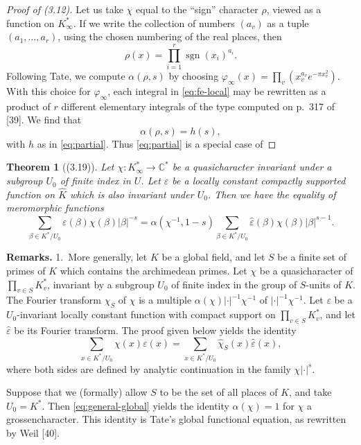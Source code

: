 \documentclass[12pt,a4paper]{article}
\theoremstyle{plain}
\newtheorem{theorem}{Theorem}[section]
\theoremstyle{definition}
\DeclareMathOperator{\sgn}{sgn}
\newcommand{\C}{\mathbb{C}}
\begin{document}
\begin{proof}[Proof of (3.12)]
Let us take $\chi$ equal to the ``sign'' character $\rho$, viewed as a function on $K_{\infty}^*$. If we write the collection of numbers $(a_v)$ as a tuple $(a_1,\dots,a_r)$, using the chosen numbering of the real places, then
\[
\rho(x)=\prod_{i=1}^r\sgn(x_i)^{a_i}.
\]
Following Tate, we compute $\alpha(\rho,s)$ by choosing $\varphi_{\infty}(x)=\prod_v(x_v^{a_v}e^{-\pi x_v^2})$. With this choice for $\varphi_{\infty}$, each integral in \eqref{eq:fe-local} may be rewritten as a product of $r$ different elementary integrals of the type computed on p.~317 of [39]. We find that
\[
\alpha(\rho,s)=h(s),
\]
with $h$ as in \eqref{eq:partial}. Thus \eqref{eq:partial} is a special case of
\end{proof}

\begin{theorem}[(3.19)]\label{thm:general-fe}
Let $\chi:K_{\infty}^*\to\C^*$ be a quasicharacter invariant under a subgroup $U_0$ of finite index in $U$. Let $\varepsilon$ be a locally constant compactly supported function on $\hat{K}$ which is also invariant under $U_0$. Then we have the equality of meromorphic functions
\[
\sum_{\beta\in K^*/U_0}\varepsilon(\beta)\chi(\beta)|\beta|^{-s}=\alpha(\chi^{-1},1-s)\sum_{\beta\in K^*/U_0}\hat{\varepsilon}(\beta)\chi(\beta)|\beta|^{s-1}.
\]
\end{theorem}

\textbf{Remarks.} 1.~More generally, let $K$ be a global field, and let $S$ be a finite set of primes of $K$ which contains the archimedean primes. Let $\chi$ be a quasicharacter of $\prod_{v\in S}K_v^*$, invariant by a subgroup $U_0$ of finite index in the group of $S$-units of $K$. The Fourier transform $\hat{\chi}_S$ of $\chi$ is a multiple $\alpha(\chi)|\cdot|^{-1}\chi^{-1}$ of $|\cdot|^{-1}\chi^{-1}$. Let $\varepsilon$ be a $U_0$-invariant locally constant function with compact support on $\prod_{v\in S}K_v^*$, and let $\hat{\varepsilon}$ be its Fourier transform. The proof given below yields the identity
\begin{equation}\label{eq:general-global}
\sum_{x\in K^*/U_0}\chi(x)\varepsilon(x)=\sum_{x\in K^*/U_0}\hat{\chi}_S(x)\hat{\varepsilon}(x),
\end{equation}
where both sides are defined by analytic continuation in the family $\chi|\cdot|^s$.

Suppose that we (formally) allow $S$ to be the set of all places of $K$, and take $U_0=K^*$. Then \eqref{eq:general-global} yields the identity $\alpha(\chi)=1$ for $\chi$ a grossencharacter. This identity is Tate's global functional equation, as rewritten by Weil [40].
\end{document}

